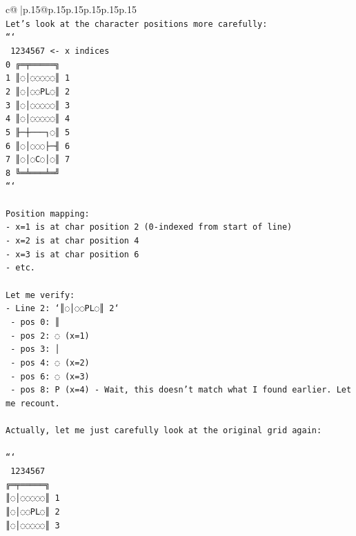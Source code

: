 \documentclass{article}
\begin{document}
{\begin{supertabular}{c@{$\;$}|p{.15\linewidth}@{}p{.15\linewidth}p{.15\linewidth}p{.15\linewidth}p{.15\linewidth}p{.15\linewidth}}
{{{\\ 
\texttt{Let's look at the character positions more carefully:} \\
\texttt{```} \\
\texttt{  1234567   <{-} x indices} \\
\texttt{0 ╔═╤═════╗} \\
\texttt{1 ║◌│◌◌◌◌◌║ 1} \\
\texttt{2 ║◌│◌◌PL◌║ 2} \\
\texttt{3 ║◌│◌◌◌◌◌║ 3} \\
\texttt{4 ║◌│◌◌◌◌◌║ 4} \\
\texttt{5 ╟─┼───┐◌║ 5} \\
\texttt{6 ║◌│◌◌◌├─╢ 6} \\
\texttt{7 ║◌│◌C◌│◌║ 7} \\
\texttt{8 ╚═╧═══╧═╝} \\
\texttt{```} \\
\\ 
\texttt{Position mapping:} \\
\texttt{{-} x=1 is at char position 2 (0{-}indexed from start of line)} \\
\texttt{{-} x=2 is at char position 4} \\
\texttt{{-} x=3 is at char position 6} \\
\texttt{{-} etc.} \\
\\ 
\texttt{Let me verify:} \\
\texttt{{-} Line 2: `║◌│◌◌PL◌║ 2`} \\
\texttt{  {-} pos 0: ║} \\
\texttt{  {-} pos 2: ◌ (x=1)} \\
\texttt{  {-} pos 3: │} \\
\texttt{  {-} pos 4: ◌ (x=2)} \\
\texttt{  {-} pos 6: ◌ (x=3)} \\
\texttt{  {-} pos 8: P (x=4) {-} Wait, this doesn't match what I found earlier. Let me recount.} \\
\\ 
\texttt{Actually, let me just carefully look at the original grid again:} \\
\\ 
\texttt{```} \\
\texttt{ 1234567} \\
\texttt{╔═╤═════╗} \\
\texttt{║◌│◌◌◌◌◌║ 1} \\
\texttt{║◌│◌◌PL◌║ 2} \\
\texttt{║◌│◌◌◌◌◌║ 3} \\
}}}
\end{supertabular}}
\end{document}
